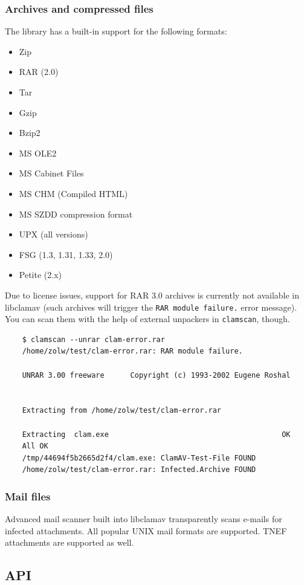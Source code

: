 \documentclass[a4paper,titlepage,12pt]{article}
\begin{document}
    \subsubsection{Archives and compressed files}
    The library has a built-in support for the following formats:
    \begin{itemize}
	\item Zip
	\item RAR (2.0)
	\item Tar
	\item Gzip
	\item Bzip2
	\item MS OLE2
	\item MS Cabinet Files
	\item MS CHM (Compiled HTML)
	\item MS SZDD compression format
	\item UPX (all versions)
	\item FSG (1.3, 1.31, 1.33, 2.0)
	\item Petite (2.x)
    \end{itemize}
    Due to license issues, support for RAR 3.0 archives is currently not
    available in libclamav (such archives will trigger the
    \verb+RAR module failure.+ error message). You can scan them with the help
    of external unpackers in \verb+clamscan+, though.
    \begin{verbatim}
	$ clamscan --unrar clam-error.rar
	/home/zolw/test/clam-error.rar: RAR module failure.

	UNRAR 3.00 freeware      Copyright (c) 1993-2002 Eugene Roshal


	Extracting from /home/zolw/test/clam-error.rar

	Extracting  clam.exe                                        OK 
	All OK
	/tmp/44694f5b2665d2f4/clam.exe: ClamAV-Test-File FOUND
	/home/zolw/test/clam-error.rar: Infected.Archive FOUND
    \end{verbatim}

    \subsubsection{Mail files}
    Advanced mail scanner built into libclamav transparently scans e-mails
    for infected attachments. All popular UNIX mail formats are supported.
    TNEF attachments are supported as well.

    \subsection{API}
\end{document}
